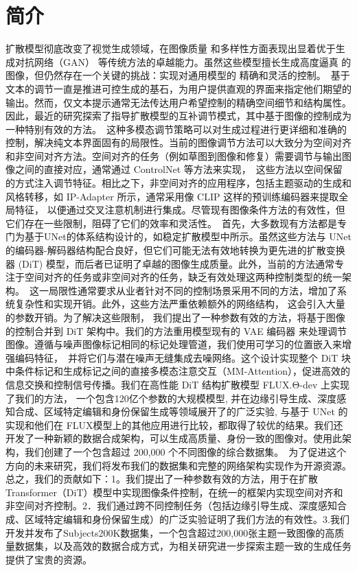 \section{简介}
扩散模型彻底改变了视觉生成领域，在图像质量 和多样性方面表现出显着优于生成对抗网络（GAN）\cite{heusel2017gans} 等传统方法的卓越能力。虽然这些模型擅长生成高度逼真 的图像，但仍然存在一个关键的挑战：实现对通用模型的 精确和灵活的控制。\
基于文本的调节一直是推进可控生成的基石，为用户提供直观的界面来指定他们期望的输出。然而，仅文本提示通常无法传达用户希望控制的精确空间细节和结构属性。 因此，最近的研究探索了指导扩散模型的互补调节模式，其中基于图像的控制成为一种特别有效的方法。\
这种多模态调节策略可以对生成过程进行更详细和准确的控制，解决纯文本界面固有的局限性。当前的图像调节方法可以大致分为空间对齐和非空间对齐方法。空间对齐的任务（例如草图到图像和修复）需要调节与输出图像之间的直接对应，通常通过 ControlNet\cite{li2025controlnet} 等方法来实现，\
这些方法以空间保留的方式注入调节特征。相比之下，非空间对齐的应用程序，包括主题驱动的生成和风格转移，如 IP-Adapter\cite{ye2023ip} 所示，通常采用像 CLIP 这样的预训练编码器来提取全局特征， 以便通过交叉注意机制进行集成。尽管现有图像条件方法的有效性，但它们存在一些限制，阻碍了它们的效率和灵活性。\
首先，大多数现有方法都是专门为基于UNet的体系结构设计的\cite{li2025controlnet,peng2024controlnext,mou2024t2i,ronneberger2015u,ruiz2023dreambooth}，如稳定扩散模型中所示。虽然这些方法与 UNet 的编码器-解码器结构配合良好，但它们可能无法有效地转换为更先进的扩散变换器 (DiT) 模型，而后者已证明了卓越的图像生成质量\cite{chen2023pixart}。此外，当前的方法通常专注于空间对齐的任务或非空间对齐的任务，缺乏有效处理这两种控制类型的统一架构。\
这一局限性通常要求从业者针对不同的控制场景采用不同的方法，增加了系统复杂性和实现开销。此外，这些方法严重依赖额外的网络结构\cite{li2024photomaker,mou2024t2i,ye2023ip,zhang2023adding,zhang2024ssr,qin2023unicontrol}， 这会引入大量的参数开销。为了解决这些限制， 我们提出了一种参数有效的方法，将基于图像的控制合并到 DiT 架构中。我们的方法重用模型现有的 VAE 编码器\cite{rombach2022high} 来处理调节图像。遵循与噪声图像标记相同的标记处理管道，我们使用可学习的位置嵌入来增强编码特征，\
并将它们与潜在噪声无缝集成去噪网络。这个设计实现整个 DiT 块中条件标记和生成标记之间的直接多模态注意交互（MM-Attention）\cite{peebles2023scalable,ruan2023mm}，促进高效的信息交换和控制信号传播。我们在高性能 DiT 结构扩散模型 FLUX.Θ-dev 上实现了我们的方法\cite{blackforestlabs_flux}， 一个包含120亿个参数的大规模模型, 并在边缘引导生成、深度感知合成、区域特定编辑和身份保留生成等领域展开了的广泛实验, 
与基于 UNet 的实现和他们在 FLUX模型上的其他应用\cite{flux1controlnet2024}进行比较，都取得了较优的结果。我们还开发了一种新颖的数据合成架构，可以生成高质量、身份一致的图像对。使用此架构，我们创建了一个包含超过 200,000 个不同图像的综合数据集。\
为了促进这个方向的未来研究，我们将发布我们的数据集和完整的网络架构实现作为开源资源。总之，我们的贡献如下：1。我们提出了一种参数有效的方法，用于在扩散Transformer（DiT）模型中实现图像条件控制，在统一的框架内实现空间对齐和非空间对齐控制。2．我们通过跨不同控制任务（包括边缘引导生成、深度感知合成、区域特定编辑和身份保留生成）的广泛实验证明了我们方法的有效性。3.我们开发并发布了Subjects200K数据集，一个包含超过200,000张主题一致图像的高质量数据集，以及高效的数据合成方式，为相关研究进一步探索主题一致的生成任务提供了宝贵的资源。
